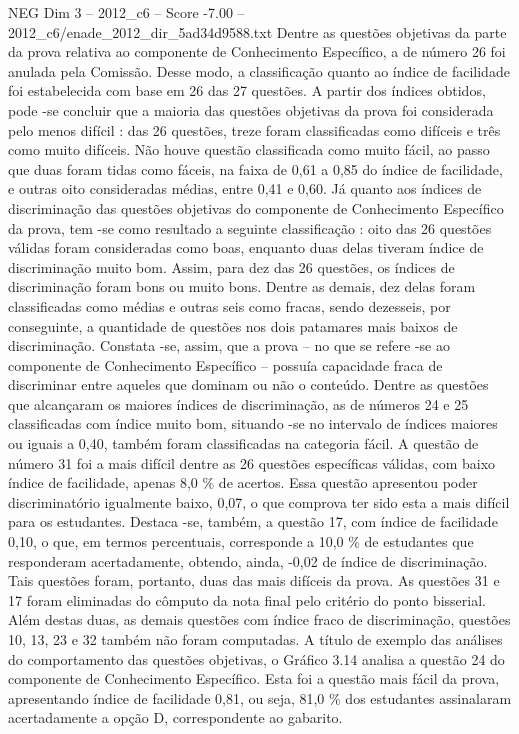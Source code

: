 \begin{textsample}{NEG Dim 3 – 2012\_c6 – Score -7.00 – 2012\_c6/enade\_2012\_dir\_5ad34d9588.txt}
Dentre as questões objetivas da parte da prova relativa ao componente de Conhecimento Específico, a de número 26 foi anulada pela Comissão.
Desse modo, a classificação quanto ao índice de facilidade foi estabelecida com base em 26 das 27 questões.
A partir dos índices obtidos, pode -se concluir que a maioria das questões objetivas da prova foi considerada pelo menos difícil : das 26 questões, treze foram classificadas como difíceis e três como muito difíceis.
Não houve questão classificada como muito fácil, ao passo que duas foram tidas como fáceis, na faixa de 0,61 a 0,85 do índice de facilidade, e outras oito consideradas médias, entre 0,41 e 0,60.
Já quanto aos índices de discriminação das questões objetivas do componente de Conhecimento Específico da prova, tem -se como resultado a seguinte classificação : oito das 26 questões válidas foram consideradas como boas, enquanto duas delas tiveram índice de discriminação muito bom.
Assim, para dez das 26 questões, os índices de discriminação foram bons ou muito bons.
Dentre as demais, dez delas foram classificadas como médias e outras seis como fracas, sendo dezesseis, por conseguinte, a quantidade de questões nos dois patamares mais baixos de discriminação.
Constata -se, assim, que a prova – no que se refere -se ao componente de Conhecimento Específico – possuía capacidade fraca de discriminar entre aqueles que dominam ou não o conteúdo.
Dentre as questões que alcançaram os maiores índices de discriminação, as de números 24 e 25 classificadas com índice muito bom, situando -se no intervalo de índices maiores ou iguais a 0,40, também foram classificadas na categoria fácil.
A questão de número 31 foi a mais difícil dentre as 26 questões específicas válidas, com baixo índice de facilidade, apenas 8,0 \% de acertos.
Essa questão apresentou poder discriminatório igualmente baixo, 0,07, o que comprova ter sido esta a mais difícil para os estudantes.
Destaca -se, também, a questão 17, com índice de facilidade 0,10, o que, em termos percentuais, corresponde a 10,0 \% de estudantes que responderam acertadamente, obtendo, ainda, -0,02 de índice de discriminação.
Tais questões foram, portanto, duas das mais difíceis da prova.
As questões 31 e 17 foram eliminadas do cômputo da nota final pelo critério do ponto bisserial.
Além destas duas, as demais questões com índice fraco de discriminação, questões 10, 13, 23 e 32 também não foram computadas.
A título de exemplo das análises do comportamento das questões objetivas, o Gráfico 3.14 analisa a questão 24 do componente de Conhecimento Específico.
Esta foi a questão mais fácil da prova, apresentando índice de facilidade 0,81, ou seja, 81,0 \% dos estudantes assinalaram acertadamente a opção D, correspondente ao gabarito.

\end{textsample}
